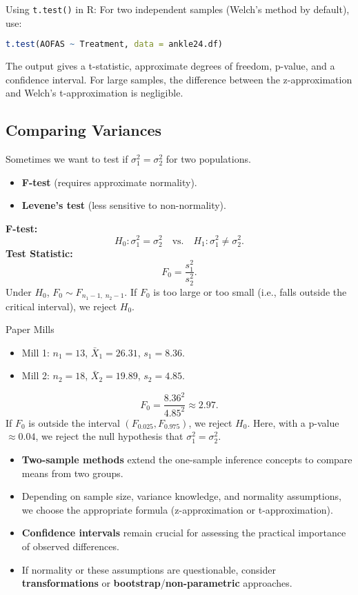 \documentclass[10pt]{extarticle}
\begin{document}
\begin{conceptbox}{Using \texttt{t.test()} in R:}{}
    For two independent samples (Welch’s method by default), use:
    \begin{lstlisting}[language=r]
    t.test(AOFAS ~ Treatment, data = ankle24.df)
    \end{lstlisting}
    The output gives a t-statistic, approximate degrees of freedom, p-value, and a confidence interval. For large samples, the difference between the z-approximation and Welch’s t-approximation is negligible.
\end{conceptbox}


\subsection{Comparing Variances}
Sometimes we want to test if $\sigma_1^2 = \sigma_2^2$ for two populations.
\begin{itemize}
    \item \textbf{F-test} (requires approximate normality).
    \item \textbf{Levene’s test} (less sensitive to non-normality).
\end{itemize}
\textbf{F-test:}
$$
H_0: \sigma_1^2 = \sigma_2^2 \quad \text{vs.} \quad H_1: \sigma_1^2 \neq \sigma_2^2.
$$
\textbf{Test Statistic:}
$$
F_0 = \frac{s_1^2}{s_2^2}.
$$
Under $H_0$, $F_0 \sim F_{n_1-1,\;n_2-1}$. If $F_0$ is too large or too small (i.e., falls outside the critical interval), we reject $H_0$.
\begin{examplebox}{Paper Mills}{}
    \begin{itemize}
        \item Mill 1: $n_1=13$, $\bar{X}_1=26.31$, $s_1=8.36$.
        \item Mill 2: $n_2=18$, $\bar{X}_2=19.89$, $s_2=4.85$.
    \end{itemize}
    $$
    F_0 = \frac{8.36^2}{4.85^2} \approx 2.97.
    $$
    If $F_0$ is outside the interval $(F_{0.025}, F_{0.975})$, we reject $H_0$. Here, with a p-value $\approx 0.04$, we reject the null hypothesis that $\sigma_1^2=\sigma_2^2$.
\end{examplebox}
\begin{takeaway-box}{}{}
\begin{itemize}
    \item \textbf{Two-sample methods} extend the one-sample inference concepts to compare means from two groups.
    \item Depending on sample size, variance knowledge, and normality assumptions, we choose the appropriate formula (z-approximation or t-approximation).
    \item \textbf{Confidence intervals} remain crucial for assessing the practical importance of observed differences.
    \item If normality or these assumptions are questionable, consider \textbf{transformations} or \textbf{bootstrap}/\textbf{non-parametric} approaches.
\end{itemize}
\end{takeaway-box}
\end{document}
